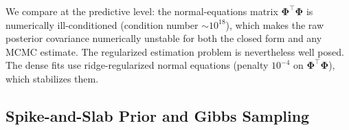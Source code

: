 \documentclass[review,1p,times]{elsarticle}
\begin{document}
We compare at the predictive level: the normal-equations matrix $\boldsymbol{\Phi}^{\top}\boldsymbol{\Phi}$ is numerically ill-conditioned (condition number $\sim10^{18}$), which makes the raw posterior covariance numerically unstable for both the closed form and any MCMC estimate.
The regularized estimation problem is nevertheless well posed.
The dense fits use ridge-regularized normal equations (penalty $10^{-4}$ on $\boldsymbol{\Phi}^{\top}\boldsymbol{\Phi}$), which stabilizes them.

\subsection{Spike-and-Slab Prior and Gibbs Sampling}
\label{sec:gibbs}
\end{document}
